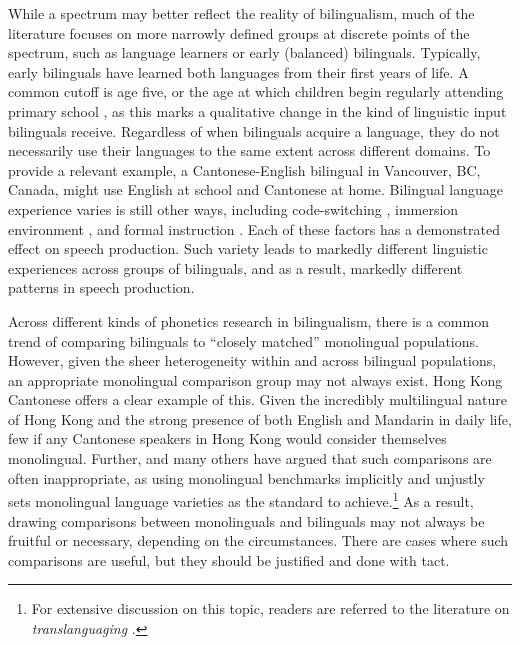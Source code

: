 While a spectrum may better reflect the reality of bilingualism, much of the literature focuses on more narrowly defined groups at discrete points of the spectrum, such as language learners or early (balanced) bilinguals. Typically, early bilinguals have learned both languages from their first years of life. A common cutoff is age five, or the age at which children begin regularly attending primary school \citep{amengual_2017_type}, as this marks a qualitative change in the kind of linguistic input bilinguals receive. Regardless of when bilinguals acquire a language, they do not necessarily use their languages to the same extent across different domains. To provide a relevant example, a Cantonese-English bilingual in Vancouver, BC, Canada, might use English at school and Cantonese at home. Bilingual language experience varies is still other ways, including code-switching \citep{fricke_2016_dimensions}, immersion environment \citep{sancier_1997_drift}, and formal instruction \citep{fricke_2019_bilingualism}. Each of these factors has a demonstrated effect on speech production. Such variety leads to markedly different linguistic experiences across groups of bilinguals, and as a result, markedly different patterns in speech production. 

Across different kinds of phonetics research in bilingualism, there is a common trend of comparing bilinguals to ``closely matched'' monolingual populations. However, given the sheer heterogeneity within and across bilingual populations, an appropriate monolingual comparison group may not always exist. Hong Kong Cantonese offers a clear example of this. Given the incredibly multilingual nature of Hong Kong and the strong presence of both English and Mandarin in daily life, few if any Cantonese speakers in Hong Kong would consider themselves monolingual. Further, \citet{grosjean_1989_bilingual} and many others have argued that such comparisons are often inappropriate, as using monolingual benchmarks implicitly and unjustly sets monolingual language varieties as the standard to achieve.\footnote{For extensive discussion on this topic, readers are referred to the literature on \textit{translanguaging} \citep[e.g.,][]{wei_2018_translanguaging}.} As a result, drawing comparisons between monolinguals and bilinguals may not always be fruitful or necessary, depending on the circumstances. There are cases where such comparisons are useful, but they should be justified and done with tact. 

